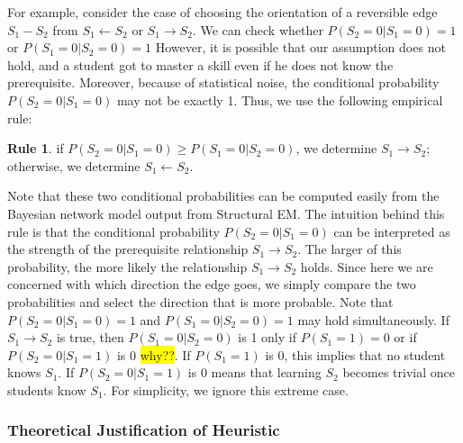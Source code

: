 \documentclass{edm_template}
\newcommand{\hl}[1]{\colorbox{yellow}{#1}}
\begin{document}
For example, consider the case of choosing the orientation of a reversible edge $S_1 - S_2$ from $S_1 \leftarrow S_2$ or  $S_1 \rightarrow S_2$.
We can check whether $P(S_2=0|S_1=0)=1$ or $P(S_1=0|S_2=0)=1$
However, it is possible that our assumption does not hold, and a student got to master a skill even if he does not know the prerequisite. 
Moreover, because of statistical noise,  the conditional probability $P(S_2=0|S_1=0)$ may not  be exactly 1.
Thus, we use the following empirical rule: 

\textbf{Rule 1}. if $P(S_2=0|S_1=0)\ge P(S_1=0|S_2=0)$, we determine $S_1\rightarrow S_2$; otherwise, we determine $S_1\leftarrow S_2$.

Note that these two conditional probabilities can be computed easily from the Bayesian network model output from Structural EM. 
The intuition behind this rule is that the conditional probability $P(S_2=0|S_1=0)$ can be interpreted as the strength of the prerequisite relationship $S_1\rightarrow S_2$.
The larger of this probability, the more likely the relationship $S_1\rightarrow S_2$ holds.
Since here we are concerned with which direction the edge goes, we simply compare the two probabilities and select the direction that is more probable. 
Note  that $P(S_2=0|S_1=0)=1$ and $P(S_1=0|S_2=0)=1$ may hold simultaneously. 
If $S_1\rightarrow S_2$ is true, then $P(S_1=0|S_2=0)$ is 1 only if $P(S_1=1)=0$ or if $P(S_2=0|S_1=1)$ is 0 \hl{why??}. 
If $P(S_1=1)$ is 0, this implies that no student knows $S_1$. 
If $P(S_2=0|S_1=1)$ is 0 means that learning $S_2$ becomes trivial once students know $S_1$. 
For simplicity, we ignore this extreme case.


\subsubsection{Theoretical Justification of Heuristic}
\label{sec:theory}
\end{document}
